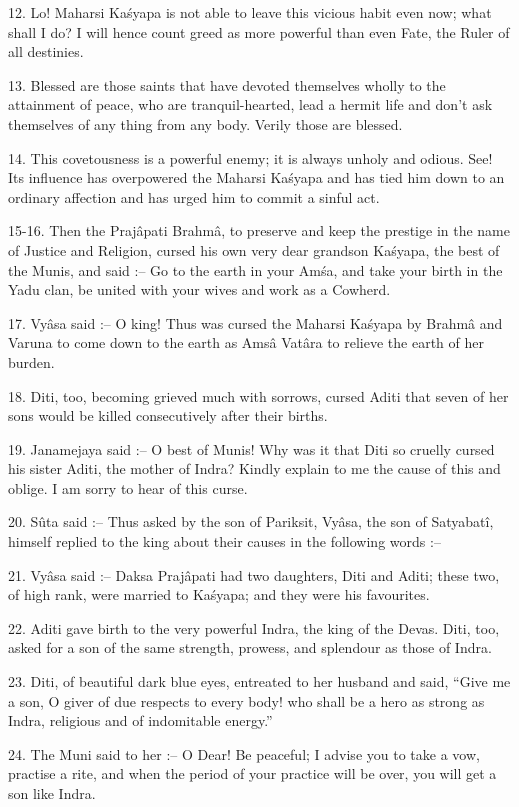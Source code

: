 12. Lo! Maharsi Ka\'syapa is not able to leave this vicious habit even now; what shall I do? I will hence count greed as more powerful than even Fate, the Ruler of all destinies.

13. Blessed are those saints that have devoted themselves wholly to the attainment of peace, who are tranquil-hearted, lead a hermit life and don't ask themselves of any thing from any body. Verily those are blessed.

14. This covetousness is a powerful enemy; it is always unholy and odious. See! Its influence has overpowered the Maharsi Ka\'syapa and has tied him down to an ordinary affection and has urged him to commit a sinful act.

15-16. Then the Praj\^apati Brahm\^a, to preserve and keep the prestige in the name of Justice and Religion, cursed his own very dear grandson Ka\'syapa, the best of the Munis, and said :-- Go to the earth in your Am\'sa, and take your birth in the Yadu clan, be united with your wives and work as a Cowherd.

17. Vy\^asa said :-- O king! Thus was cursed the Maharsi Ka\'syapa by Brahm\^a and Varuna to come down to the earth as Ams\^a Vat\^ara to relieve the earth of her burden.

18. Diti, too, becoming grieved much with sorrows, cursed Aditi that seven of her sons would be killed consecutively after their births.

19. Janamejaya said :-- O best of Munis! Why was it that Diti so cruelly cursed his sister Aditi, the mother of Indra? Kindly explain to me the cause of this and oblige. I am sorry to hear of this curse.

20. Sûta said :-- Thus asked by the son of Pariksit, Vy\^asa, the son of Satyabat\^i, himself replied to the king about their causes in the following words :--

21. Vy\^asa said :-- Daksa Praj\^apati had two daughters, Diti and Aditi; these two, of high rank, were married to Ka\'syapa; and they were his favourites.

22. Aditi gave birth to the very powerful Indra, the king of the Devas. Diti, too, asked for a son of the same strength, prowess, and splendour as those of Indra.

23. Diti, of beautiful dark blue eyes, entreated to her husband and said, ``Give me a son, O giver of due respects to every body! who shall be a hero as strong as Indra, religious and of indomitable energy.''

24. The Muni said to her :-- O Dear! Be peaceful; I advise you to take a vow, practise a rite, and when the period of your practice will be over, you will get a son like Indra.


